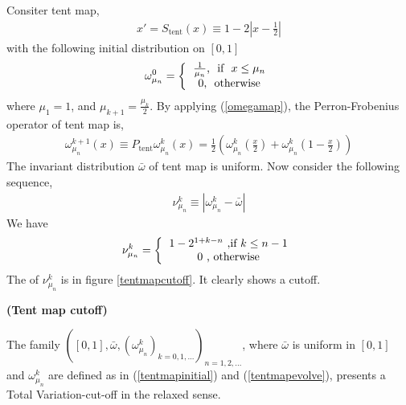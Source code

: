 Consiter tent map,
   \begin{eqnarray}
   \label{tentmap}
     x' = S_\text{tent}(x) \equiv 1-2|x-\frac{1}{2}|
   \end{eqnarray}
with the following initial distribution on $[0 ,1]$
  \begin{eqnarray}
  \label{tentmapinitial}
    \omega_{\mu_n}^0 = \left\{ \begin{tabular}{c}
                      $\frac{1}{\mu_n}$, \mbox{  if  } $x \le \mu_n$\\ 
                      $0$, \mbox{  otherwise} 
                      \end{tabular}\right.
  \end{eqnarray}
where $\mu_1 = 1$, and $\mu_{k+1} = \frac{\mu_k}{2}$. By applying (\ref{omegamap}), the Perron-Frobenius operator of tent map is,
  \begin{eqnarray}
  \label{tentmapevolve}
    \omega_{\mu_n}^{k+1}(x) \equiv P_\text{tent} \omega_{\mu_n}^{k}(x)
                             = \frac{1}{2}\left( \omega_{\mu_n}^{k}\left(\frac{x}{2}\right)+
                                                 \omega_{\mu_n}^{k}\left(1-\frac{x}{2}\right)  \right)
  \end{eqnarray}
The invariant distribution $\bar{\omega}$ of tent map is uniform. Now consider the following sequence,
 \begin{eqnarray}
  \nu_{\mu_n}^k \equiv  |\omega_{\mu_n}^k-\bar{\omega} | 
 \end{eqnarray}
We have 
 \begin{eqnarray}
   \nu_{\mu_n}^k =  \left\{ \begin{tabular}{c} 
                    $1- 2^{1+k-n} $  ,if $k \le n-1$ \\
                    $0$   , otherwise
                    \end{tabular}\right.
 \end{eqnarray}
The of $\nu_{\mu_n}^k$ is in figure \ref{tentmapcutoff}. It clearly shows a cutoff. 

\begin{theorem} {\bfseries (Tent map cutoff)}

The family $([0,1],\bar{\omega}, (\omega^k_{\mu_n})_{k=0,1,...})_{n=1,2,...}$, where $\bar{\omega}$ is uniform in $[0,1]$ and $\omega^k_{\mu_n}$ are defined as in (\ref{tentmapinitial}) and (\ref{tentmapevolve}), presents a Total Variation-cut-off in the relaxed sense.
\end{theorem}




